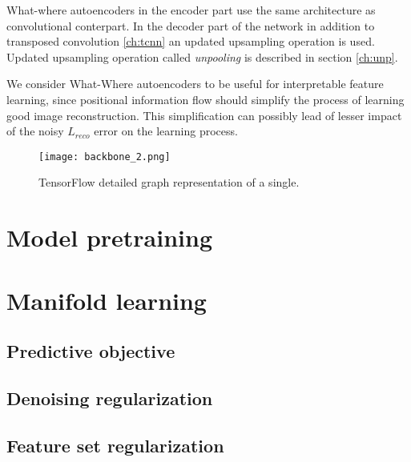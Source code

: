 What-where autoencoders in the encoder part use the same architecture as convolutional conterpart.
In the decoder part of the network in addition to transposed convolution \ref{ch:tcnn} an updated upsampling operation is used. Updated upsampling operation called \textit{unpooling} is described in section \ref{ch:unp}.

We consider What-Where autoencoders to be useful for interpretable feature learning, since positional information flow should simplify the process of learning good image reconstruction. This simplification can possibly lead of lesser impact of the noisy $L_{reco}$ error on the learning process.

\begin{figure}[h!]
  \centering
    \texttt{[image: backbone\_2.png]}
  \caption{TensorFlow detailed graph representation of a single.}
  \label{fig:tf_graph}
\end{figure}

\section{Model pretraining}



\section{Manifold learning}\label{ss:mf}
\subsection{Predictive objective}
\subsection{Denoising regularization}
\subsection{Feature set regularization}
